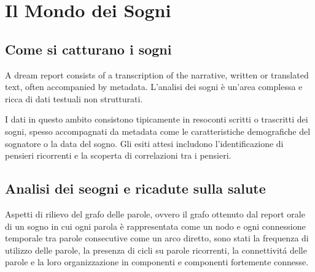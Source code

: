 \chapter{Il Mondo dei Sogni} \label{cap:mondo-dei-sogni}


\section{Come si catturano i sogni}

A dream report consists of a transcription of the narrative, written or translated text, often accompanied by metadata.
 L'analisi dei sogni è un'area complessa e ricca di dati testuali non strutturati.

I dati in questo ambito consistono tipicamente in resoconti scritti o trascritti dei sogni, spesso accompagnati da
metadata come le caratteristiche demografiche del sognatore o la data del sogno. Gli esiti attesi includono
l'identificazione di pensieri ricorrenti e la scoperta di correlazioni tra i pensieri.

\section{Analisi dei seogni e ricadute sulla salute}


Aspetti di rilievo del grafo delle parole, ovvero il grafo ottenuto dal report orale di un sogno in cui
ogni parola \`e rappresentata come un nodo e ogni connessione temporale tra parole consecutive come un arco diretto,
sono stati la frequenza di utilizzo delle parole, la presenza di cicli su parole ricorrenti, la connettivit\'a delle
parole e la loro organizzazione in componenti e componenti fortemente connesse. \newline